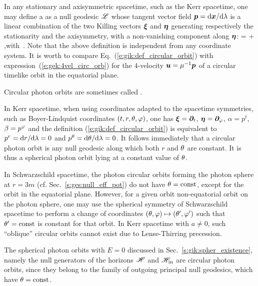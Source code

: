 In any stationary and axisymmetric spacetime, such as the Kerr spacetime, one may
define a 
as a null geodesic $\mathscr{L}$ whose tangent vector field $\bm{p}=\mathrm{d}\bm{x}/\mathrm{d}\lambda$ is a linear combination
of the two Killing vectors $\bm{\xi}$ and $\bm{\eta}$ generating respectively
the stationarity and the axisymmetry, with a non-vanishing component along $\bm{\eta}$:
\be \label{e:gik:def_circular_orbit}
     = \alpha \w{\xi} + \beta \w{\eta} ,\quad\mbox{with}\ \beta {}.
\ee
Note that the above definition is independent from any coordinate system.
It is worth to compare Eq.~(\ref{e:gik:def_circular_orbit}) with expression~(\ref{e:gek:4vel_circ_orb}) for the 4-velocity $\bm{u} = \mu^{-1}\bm{p}$ of a circular timelike orbit in the equatorial plane.

\begin{remark}
Circular photon orbits are sometimes called 
\cite{CunhaH18}.
\end{remark}

In Kerr spacetime, when using coordinates adapted to the spacetime symmetries,
such as Boyer-Lindquist coordinates $(t,r,\theta,\varphi)$, one has $\bm{\xi} = \bm{\partial}_t$,
$\bm{\eta}=\bm{\partial}_\varphi$, $\alpha=p^t$, $\beta=p^\varphi$ and the definition (\ref{e:gik:def_circular_orbit})
is equivalent to $p^r = \mathrm{d} r/\mathrm{d}\lambda = 0$ and $p^\theta = \mathrm{d}\theta/\mathrm{d}\lambda = 0$. It follows immediately
that a circular photon orbit is any null geodesic
along which both $r$ and $\theta$ are constant. It is thus a spherical photon orbit lying at a constant
value of $\theta$.

\begin{remark}
In Schwarzschild spacetime, the photon circular orbits forming the photon sphere
at $r=3m$ (cf. Sec.~\ref{s:ges:null_eff_pot}) do not have $\theta=\mathrm{const}$, except
for the orbit in the equatorial plane. However, for a given orbit non-equatorial
orbit on the photon sphere, one may use the spherical symmetry of Schwarzschild spacetime
to perform a change of coordinates $(\theta,\varphi) \mapsto (\theta',\varphi')$ such that
$\theta' = \mathrm{const}$ is constant for that orbit.
In Kerr spacetime with $a\neq 0$, such
``oblique'' circular orbits cannot exist due to Lense-Thirring precession.
\end{remark}

\begin{example}
The spherical photon orbits with $E=0$ discussed in Sec.~\ref{s:gik:spher_existence},
namely the null generators of the horizons $\mathscr{H}$ and $\mathscr{H}_{\rm in}$ are
circular photon orbits, since they belong to the family of outgoing principal
null geodesics, which have $\theta=\mathrm{const}$.
\end{example}

